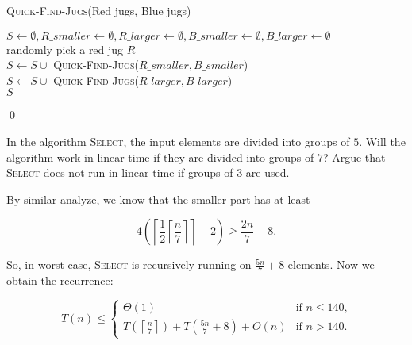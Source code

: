 \begin{algorithm}[H]
\caption{\textsc{Quick-Find-Jugs}(Red jugs, Blue jugs)}
$S \leftarrow \emptyset, R\_smaller \leftarrow \emptyset, R\_larger \leftarrow \emptyset, B\_smaller \leftarrow \emptyset, B\_larger \leftarrow \emptyset$\\
randomly pick a red jug $R$\\
$S \leftarrow S \cup $ \textsc{Quick-Find-Jugs}($R\_smaller, B\_smaller$)\\
$S \leftarrow S \cup $ \textsc{Quick-Find-Jugs}($R\_larger, B\_larger$)\\
\Return $S$\\
\end{algorithm}
\qed

In the algorithm \textsc{Select}, the input elements are divided into groups of $5$. Will the algorithm work in linear time if they are divided into groups of $7$? Argue that
\textsc{Select} does not run in linear time if groups of $3$ are used.
\answer

By similar analyze, we know that the smaller part has at least

$$ 4\left(\left\lceil\frac{1}{2}\left\lceil\frac{n}{7}\right\rceil\right\rceil-2\right)\geq \frac{2n}{7} - 8.$$

So, in worst case, \textsc{Select} is recursively running on $\frac{5n}{7} + 8$ elements. Now we obtain the recurrence:

\begin{equation*}
T(n) \leq \left\{
  \begin{array}{ll}
    \Theta(1)     & \text{if $n \leq 140$,}\\
    T\left(\left\lceil\frac{n}{7}\right\rceil\right) + T\left(\frac{5n}{7} + 8\right) + O(n) & \text{if $n > 140$.}
  \end{array}
\right.
\end{equation*}

